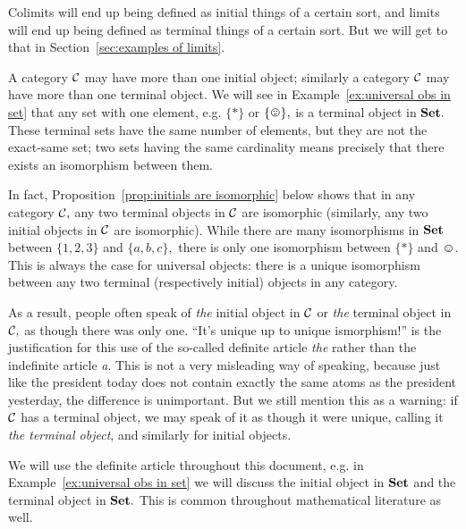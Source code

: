 \documentclass[../main/CT4S-EN-RU]{subfiles}
\begin{document}
\begin{blockENG}
Colimits will end up being defined as initial things of a certain sort, and limits will end up being defined as terminal things of a certain sort. But we will get to that in Section~\ref{sec:examples of limits}.
\end{blockENG}

\begin{blockRUS}
\end{blockRUS}

\begin{warningENG}
A category $\mathcal{C}$ may have more than one initial object; similarly a category $\mathcal{C}$ may have more than one terminal object. We will see in Example~\ref{ex:universal obs in set} that any set with one element, e.g. $\{*\}$ or $\singleton,$ is a terminal object in ${\mathbf{Set}}.$ These terminal sets have the same number of elements, but they are not the exact-same set; two sets having the same cardinality means precisely that there exists an isomorphism between them.

In fact, Proposition~\ref{prop:initials are isomorphic} below shows that in any category $\mathcal{C},$ any two terminal objects in $\mathcal{C}$ are isomorphic (similarly, any two initial objects in $\mathcal{C}$ are isomorphic). While there are many isomorphisms in ${\mathbf{Set}}$ between $\{1,2,3\}$ and $\{a,b,c\},$ there is only one isomorphism between $\{*\}$ and $\smiley.$ This is always the case for universal objects: there is a unique isomorphism between any two terminal (respectively initial) objects in any category.

As a result, people often speak of {\em the} initial object in $\mathcal{C}$ or {\em the} terminal object in $\mathcal{C},$ as though there was only one. “It's unique up to unique ismorphism!” is the justification for this use of the so-called definite article {\em the} rather than the indefinite article {\em a}. This is not a very misleading way of speaking, because just like the president today does not contain exactly the same atoms as the president yesterday, the difference is unimportant. But we still mention this as a warning: if $\mathcal{C}$ has a terminal object, we may speak of it as though it were unique, calling it {\em the terminal object}, and similarly for initial objects.

We will use the definite article throughout this document, e.g. in Example~\ref{ex:universal obs in set} we will discuss the initial object in ${\mathbf{Set}}$ and the terminal object in ${\mathbf{Set}}.$ This is common throughout mathematical literature as well.
\end{warningENG}
\end{document}
